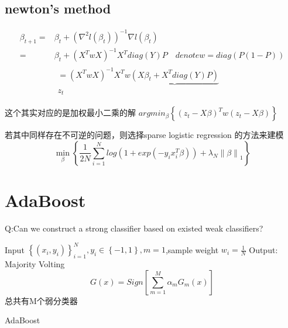 \documentclass[lang=cn,11pt,a4paper]{elegantpaper}
\theoremstyle{plain}
\theoremstyle{remark}
\begin{document}
\subsection{newton's method}
\begin{equation*}
    \begin{aligned}
    \beta_{t+1} =& \beta_t + (\nabla^2{l(\beta_t)})^{-1}\nabla {l(\beta_t)} \\
    =&\beta _t + (X^TwX)^{-1}X^Tdiag(Y)P\quad denote w = diag(P(1-P))\\
     &\begin{array}{c}
        = (X^TwX)^{-1} X^Tw\underbrace{(X\beta_t+X^Tdiag(Y)P)}\\z_t
    \end{array}
    \end{aligned}
\end{equation*}

这个其实对应的是加权最小二乘的解 $argmin_{\beta} \left\{ (z_t-X\beta)^Tw(z_t-X\beta) \right\}  $ 

若其中同样存在不可逆的问题，则选择sparse logistic regression 的方法来建模
$$ \min_{\beta} \left\{ \frac{1}{2N} \sum_{i=1}^{N}log(1+exp(-y_ix_i^T\beta))+\lambda_N \left\| \beta \right\|_1  \right\}  $$

\section{AdaBoost}
Q:Can we construct a strong classifier based on existed weak classifiers?

\begin{algorithm}[H]
    \SetAlgoLined
     Input $\left\{ (x_i,y_i) \right\}_{i=1}^N,y_i \in \left\{ -1,1 \right\} ,m=1 $,sample weight $w_i = \frac{1}{N}$  \;
     Output: Majority Volting
     $$ G(x) = Sign \left[\sum_{m=1}^M\alpha_m G_m(x)\right] $$ 总共有M个弱分类器
     \caption{AdaBoost}
    \end{algorithm}
\end{document}

